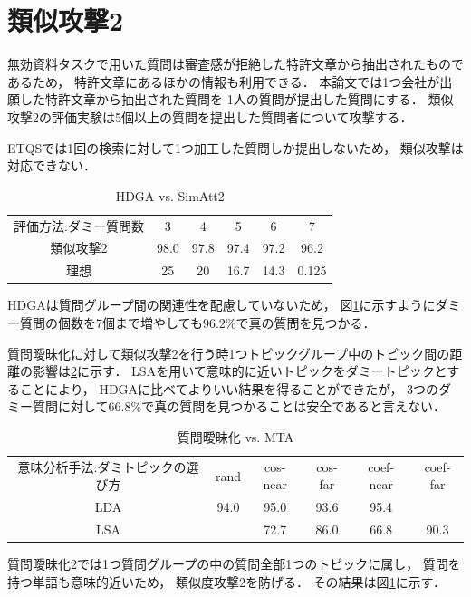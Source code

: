 \documentclass[master]{suribt}
\theoremstyle{definition}
\begin{document}
 \section{類似攻撃2}

 無効資料タスクで用いた質問は審査感が拒絶した特許文章から抽出されたものであるため，
 特許文章にあるほかの情報も利用できる．
 本論文では1つ会社が出願した特許文章から抽出された質問を
 1人の質問が提出した質問にする．
 類似攻撃2の評価実験は5個以上の質問を提出した質問者について攻撃する．

 ETQSでは1回の検索に対して1つ加工した質問しか提出しないため，
 類似攻撃は対応できない．

 \begin{table}[!hbp]
 \center
 \begin{tabular}{|c|c|c|c|c|c|}
 \hline
 評価方法:ダミー質問数  & 3 & 4 & 5 & 6 & 7    \\
 類似攻撃2 & 98.0 & 97.8 & 97.4 & 97.2 & 96.2 \\
 理想 & 25 & 20 & 16.7 & 14.3 & 0.125 \\
 \hline
 \end{tabular}
 \label{tab:s2:HDGA}
 \caption{HDGA vs. SimAtt2}
 \end{table}

 HDGAは質問グループ間の関連性を配慮していないため，
 図\ref{tab:s2:HDGA}に示すようにダミー質問の個数を7個まで増やしても$96.2\%$で真の質問を見つかる．

 質問曖昧化に対して類似攻撃2を行う時1つトピックグループ中のトピック間の距離の影響は\ref{tab:mt:AAAA}に示す．
 LSAを用いて意味的に近いトピックをダミートピックとすることにより，
 HDGAに比べてよりいい結果を得ることができたが，
 3つのダミー質問に対して$66.8\%$で真の質問を見つかることは安全であると言えない．

 \begin{table}[!hbp]
 \center
 \begin{tabular}{|c|c|c|c|c|c|}
 \hline
 意味分析手法:ダミトピックの選び方 & rand & cos-near & cos-far & coef-near & coef-far \\
 LDA & 94.0 & 95.0  & 93.6  & 95.4 & \\
 LSA &  & 72.7 & 86.0 & 66.8 & 90.3 \\
 \hline
 \end{tabular}
 \caption{質問曖昧化 vs. MTA}
 \label{tab:mt:AAAA}
 \end{table}

 質問曖昧化2では1つ質問グループの中の質問全部1つのトピックに属し，
 質問を持つ単語も意味的近いため，
 類似度攻撃2を防げる．
 その結果は図\ref{}に示す．
 
\end{document}

